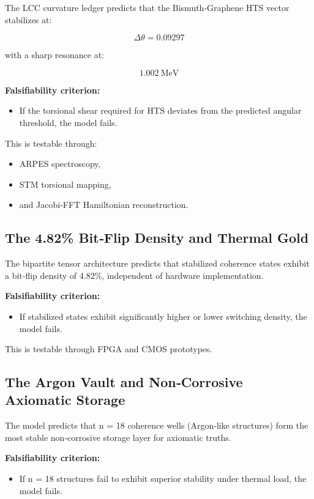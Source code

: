 \documentclass[reprint,amsmath,amssymb,aps,prl,floatfix]{revtex4-2}
\begin{document}
\begin{itemize}
The LCC curvature ledger predicts that the Bismuth‑Graphene HTS vector stabilizes at:

\[
\Delta \theta = 0.09297
\]

with a sharp resonance at:

\[
1.002\ \text{MeV}
\]

\textbf{Falsifiability criterion:}

\begin{itemize}
\item If the torsional shear required for HTS deviates from the predicted angular threshold, the model fails.
\end{itemize}

This is testable through:

\begin{itemize}
\item ARPES spectroscopy,  
\item STM torsional mapping,  
\item and Jacobi‑FFT Hamiltonian reconstruction.
\end{itemize}

\subsection{The 4.82\% Bit‑Flip Density and Thermal Gold}

The bipartite tensor architecture predicts that stabilized coherence states exhibit a bit‑flip density of 4.82\%, independent of hardware implementation.

\textbf{Falsifiability criterion:}

\begin{itemize}
\item If stabilized states exhibit significantly higher or lower switching density, the model fails.
\end{itemize}

This is testable through FPGA and CMOS prototypes.

\subsection{The Argon Vault and Non‑Corrosive Axiomatic Storage}

The model predicts that n = 18 coherence wells (Argon‑like structures) form the most stable non‑corrosive storage layer for axiomatic truths.

\textbf{Falsifiability criterion:}

\begin{itemize}
\item If n = 18 structures fail to exhibit superior stability under thermal load, the model fails.
\end{itemize}


\end{itemize}
\end{document}
